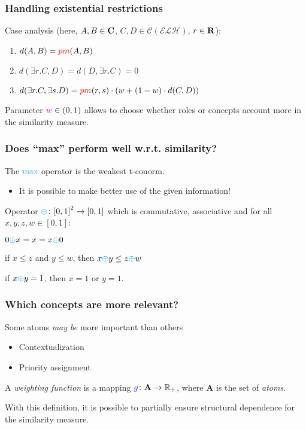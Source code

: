\documentclass[smaller]{beamer}
\begin{document}
\begin{frame}
  \frametitle{Handling existential restrictions}
  Case analysis (here, \(A,B \in \mathbf{C}\),
  \(C,D \in \mathcal{C}(\mathcal{ELH})\),
  \(r \in \mathbf{R}\)):
  \begin{enumerate}[<+->]
    \item \(d(A,B) = \textcolor{red}{pm}(A,B)\)
    \item \(d(\exists{}r.C,D) = d(D,\exists{}r.C) = 0\)
    \item \(d(\exists{}r.C,\exists{}s.D) =
    \textcolor{red}{pm}(r,s) \cdot \left(w + (1-w) \cdot d(C,D)\right)\)
  \end{enumerate}

  Parameter \(\textcolor{magenta}{w} \in (0,1)\) allows
  to choose whether roles or concepts account more
  in the similarity measure.
\end{frame}

\begin{frame}
  \frametitle{Does ``max'' perform well w.r.t. similarity?}
  The \(\textcolor{cyan}{\max}\) operator is the weakest \alert{t-conorm}.
  \begin{itemize}
    \item It is possible to make better use of
          the given information!
  \end{itemize}
  \pause
  \begin{definition}
    Operator \(\textcolor{cyan}{\oplus} \colon {[0,1]}^2 \to [0,1]\) which is
    commutative, associative and for all
    \(x, y, z, w \in [0,1]\):
    \begin{description}[<+->]
      \item[Unit element] \(0 \textcolor{cyan}{\oplus} x = x = x \textcolor{cyan}{\oplus} 0\)
      \item[Monotonicity] if \(x \le z\) and \(y \le w\), then \(x \textcolor{cyan}{\oplus} y \le z \textcolor{cyan}{\oplus} w\)
      \item[Boundedness] if \(x \textcolor{cyan}{\oplus} y = 1\), then \(x = 1\) or \(y = 1\).
    \end{description}
  \end{definition}
\end{frame}

\begin{frame}
  \frametitle{Which concepts are more relevant?}
  Some atoms \textit{may be} more important than others
  \begin{itemize}
    \item Contextualization
    \item Priority assignment
  \end{itemize}
  \begin{definition}
    A \emph{weighting function} is a mapping 
    \(\textcolor{blue}{g} \colon \mathbf{A} \to \mathbb{R}_+\),
     where \(\mathbf{A}\) is the set of \emph{atoms}.
  \end{definition}
  With this definition, it is possible to partially
  ensure structural dependence for the similarity
  measure.
\end{frame}
\end{document}
